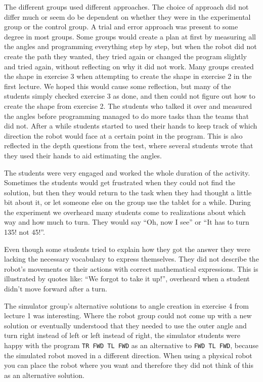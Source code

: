 \bigskip\noindent
The different groups used different approaches. The choice of approach did not differ much or seem do be dependent on whether they were in the experimental group or the control group. A trial and error approach was present to some degree in most groups. Some groups would create a plan at first by measuring all the angles and programming everything step by step, but when the robot did not create the path they wanted, they tried again or changed the program slightly and tried again, without reflecting on why it did not work. Many groups created the shape in exercise 3 when attempting to create the shape in exercise 2 in the first lecture. We hoped this would cause some reflection, but many of the students simply checked exercise 3 as done, and then could not figure out how to create the shape from exercise 2. The students who talked it over and measured the angles before programming managed to do more tasks than the teams that did not. After a while students started to used their hands to keep track of which direction the robot would face at a certain point in the program. This is also reflected in the depth questions from the test, where several students wrote that they used their hands to aid estimating the angles.

\bigskip\noindent
The students were very engaged and worked the whole duration of the activity. Sometimes the students would get frustrated when they could not find the solution, but then they would return to the task when they had thought a little bit about it, or let someone else on the group use the tablet for a while. During the experiment we overheard many students come to realizations about which way and how much to turn. They would say ``Oh, now I see'' or ``It has to turn 135! not 45!''. 

\bigskip\noindent
Even though some students tried to explain how they got the answer they were lacking the necessary vocabulary to express themselves. They did not describe the robot's movements or their actions with correct mathematical expressions. This is illustrated by quotes like: ``We forgot to take it up!'', overheard when a student didn't move forward after a turn. 

\bigskip\noindent
The simulator group's alternative solutions to angle creation in exercise 4 from lecture 1 was interesting. Where the robot group could not come up with a new solution or eventually understood that they needed to use the outer angle and turn right instead of left or left instead of right, the simulator students were happy with the program \texttt{TR FWD TL FWD} as an alternative to \texttt{FWD TL FWD}, because the simulated robot moved in a different direction. When using a physical robot you can place the robot where you want and therefore they did not think of this as an alternative solution.

